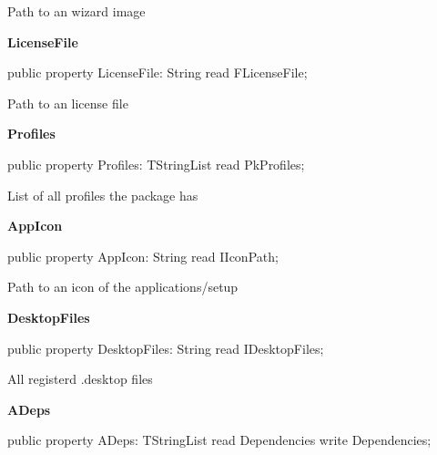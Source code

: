 \documentclass{report}
\newif\ifpdf
\begin{document}
\begin{list}{}
\begin{flushleft}
\ifpdf
\end{flushleft}
\fi


\par Path to an wizard image\label{ipkhandle.TInstallation-LicenseFile}
\item[\textbf{LicenseFile}\hfill]
\ifpdf
\begin{flushleft}
\fi
\begin{ttfamily}
public property LicenseFile: String read FLicenseFile;\end{ttfamily}

\ifpdf
\end{flushleft}
\fi


\par Path to an license file\label{ipkhandle.TInstallation-Profiles}
\item[\textbf{Profiles}\hfill]
\ifpdf
\begin{flushleft}
\fi
\begin{ttfamily}
public property Profiles: TStringList read PkProfiles;\end{ttfamily}

\ifpdf
\end{flushleft}
\fi


\par List of all profiles the package has\label{ipkhandle.TInstallation-AppIcon}
\item[\textbf{AppIcon}\hfill]
\ifpdf
\begin{flushleft}
\fi
\begin{ttfamily}
public property AppIcon: String read IIconPath;\end{ttfamily}

\ifpdf
\end{flushleft}
\fi


\par Path to an icon of the applications/setup\label{ipkhandle.TInstallation-DesktopFiles}
\item[\textbf{DesktopFiles}\hfill]
\ifpdf
\begin{flushleft}
\fi
\begin{ttfamily}
public property DesktopFiles: String read IDesktopFiles;\end{ttfamily}

\ifpdf
\end{flushleft}
\fi


\par All registerd .desktop files\label{ipkhandle.TInstallation-ADeps}
\item[\textbf{ADeps}\hfill]
\ifpdf
\begin{flushleft}
\fi
\begin{ttfamily}
public property ADeps: TStringList read Dependencies write Dependencies;\end{ttfamily}


\end{flushleft}
\end{list}
\end{document}
